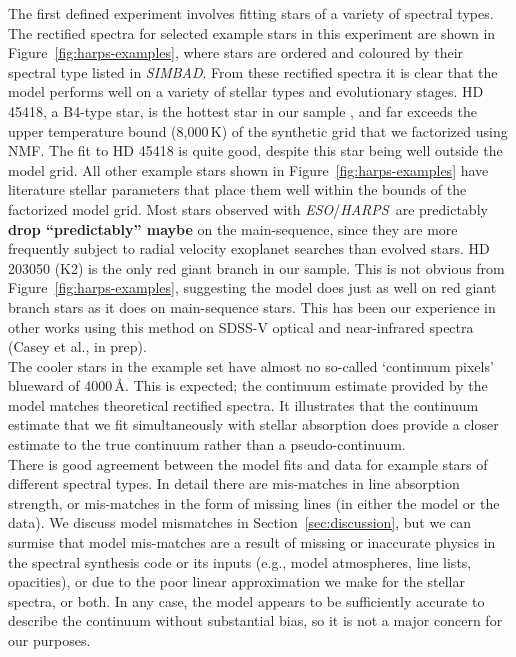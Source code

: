 \documentclass[modern]{aastex631}
\newcommand{\project}[1]{\textit{#1}}
\newcommand{\eso}{\project{ESO}}
\newcommand{\harps}{\project{HARPS}}
\newcommand{\ajw}[1]{\textbf{#1}}
\begin{document}
The first defined experiment involves fitting stars of a variety of spectral types. The rectified spectra for selected example stars in this experiment are shown in Figure~\ref{fig:harps-examples}, where stars are ordered and coloured by their spectral type listed in \project{SIMBAD}. From these rectified spectra it is clear that the model performs well on a variety of stellar types and evolutionary stages. HD 45418, a B4-type star, is the hottest star in our sample  \citep[$T_\mathrm{eff} = 16{,}750\,K$ according to ][]{2015MNRAS.454...28M}, and far exceeds the upper temperature bound (8,000\,K) of the synthetic grid that we factorized using NMF. The fit to HD 45418 is quite good, despite this star being well outside the model grid. All other example stars shown in Figure~\ref{fig:harps-examples} have literature stellar parameters that place them well within the bounds of the factorized model grid. Most stars observed with \eso/\harps\ are predictably \ajw{drop ``predictably'' maybe} on the main-sequence, since they are more frequently subject to radial velocity exoplanet searches than evolved stars. HD 203050 (K2) is the only red giant branch in our sample. This is not obvious from Figure~\ref{fig:harps-examples}, suggesting the model does just as well on red giant branch stars as it does on main-sequence stars. This has been our experience in other works using this method on SDSS-V optical and near-infrared spectra (Casey et al., in prep).\\


The cooler stars in the example set have almost no so-called `continuum pixels' blueward of 4000\,\AA. This is expected; the continuum estimate provided by the model matches theoretical rectified spectra. It illustrates that the continuum estimate that we fit simultaneously with stellar absorption does provide a closer estimate to the true continuum rather than a pseudo-continuum.\\

There is good agreement between the model fits and data for example stars of different spectral types. In detail there are mis-matches in line absorption strength, or mis-matches in the form of missing lines (in either the model or the data). We discuss model mismatches in Section~\ref{sec:discussion}, but we can surmise that model mis-matches are a result of missing or inaccurate physics in the spectral synthesis code or its inputs (e.g., model atmospheres, line lists, opacities), or due to the poor linear approximation we make for the stellar spectra, or both. In any case, the model appears to be sufficiently accurate to describe the continuum without substantial bias, so it is not a major concern for our purposes.\\
\end{document}
